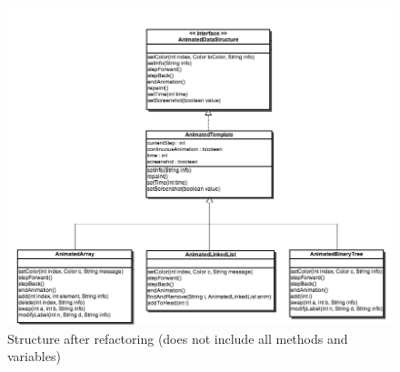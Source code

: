 \begin{figure}
\begin{center}
\includegraphics[width=\textwidth]{images/refactoring.png}
\end{center}
\caption{Structure after refactoring (does not include all methods and variables)}
\label{fig:refactoring}
\end{figure}